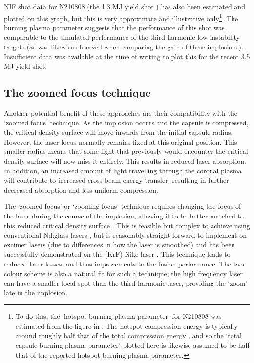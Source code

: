 NIF shot data for N210808 (the 1.3 MJ yield shot \cite{Abu-Shawareb2022}) has also been estimated and plotted on this graph, but this is very approximate and illustrative only\footnote{To do this, the `hotspot burning plasma parameter' for N210808 was estimated from the figure in \cite{Abu-Shawareb2022}. The hotspot compression energy is typically around roughly half that of the total compression energy \cite{Betti2015}, and so the `total capsule burning plasma parameter' plotted here is likewise assumed to be half that of the reported hotspot burning plasma parameter.}. The burning plasma parameter suggests that the performance of this shot was comparable to the simulated performance of the third-harmonic low-instability targets (as was likewise observed when comparing the gain of these implosions). Insufficient data was available at the time of writing to plot this for the recent 3.5 MJ yield shot. 

\subsection{The zoomed focus technique}

Another potential benefit of these approaches are their compatibility with the `zoomed focus' technique. As the implosion occurs and the capsule is compressed, the critical density surface will move inwards from the initial capsule radius. However, the laser focus normally remains fixed at this original position. This smaller radius means that some light that previously would encounter the critical density surface will now miss it entirely. This results in reduced laser absorption. In addition, an increased amount of light travelling through the coronal plasma will contribute to increased cross-beam energy transfer, resulting in further decreased absorption and less uniform compression.

The `zoomed focus' or `zooming focus' technique requires changing the focus of the laser during the course of the implosion, allowing it to be better matched to this reduced critical density surface \cite{Kehne2013, Eimerl2014}. This is feasible but complex to achieve using conventional Nd:glass lasers \cite{Obenschain2015}, but is reasonably straight-forward to implement on excimer lasers  (due to differences in how the laser is smoothed) and has been successfully demonstrated on the (KrF) Nike laser \cite{Kehne2013}. This technique leads to reduced laser losses, and thus improvements to the fusion performance. The two-colour scheme is also a natural fit for such a technique; the high frequency laser can have a smaller focal spot than the third-harmonic laser, providing the `zoom' late in the implosion.

